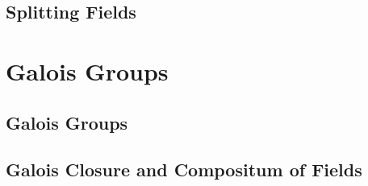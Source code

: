 

\subsection{Splitting Fields}



\vfill\break

\section{Galois Groups}

\subsection{Galois Groups}



\subsection{Galois Closure and Compositum of Fields}



\bye
